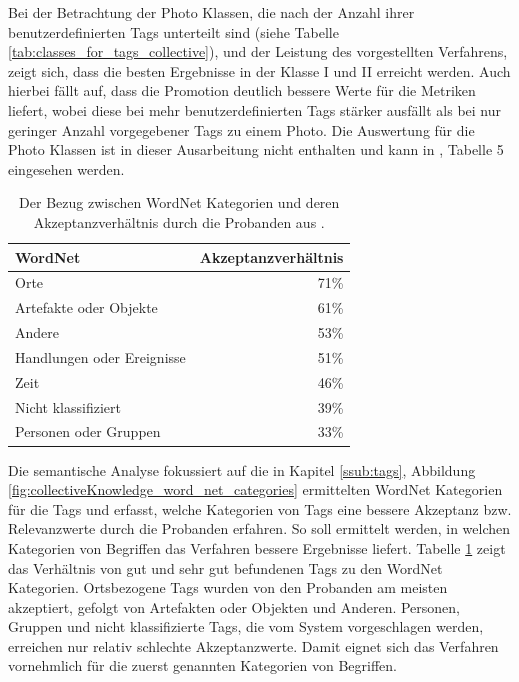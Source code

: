 Bei der Betrachtung der Photo Klassen, die nach der Anzahl ihrer benutzerdefinierten Tags unterteilt sind (siehe Tabelle \ref{tab:classes_for_tags_collective}), und der Leistung des vorgestellten Verfahrens, zeigt sich, dass die besten Ergebnisse in der Klasse I und II erreicht werden. Auch hierbei fällt auf, dass die Promotion deutlich bessere Werte für die Metriken liefert, wobei diese bei mehr benutzerdefinierten Tags stärker ausfällt als bei nur geringer Anzahl vorgegebener Tags zu einem Photo. Die Auswertung für die Photo Klassen ist in dieser Ausarbeitung nicht enthalten und kann in \cite{collectiveKnowledge}, Tabelle 5 eingesehen werden.

\begin{table}[htbp]
  \centering
  \begin{tabular}{lr}
  \hline
  \textbf{WordNet} & \textbf{Akzeptanzverhältnis}\\
  \hline
  Orte & 71\%\\
  \hline
  Artefakte oder Objekte & 61\%\\
  \hline
  Andere & 53\%\\
  \hline
  Handlungen oder Ereignisse & 51\%\\
  \hline
  Zeit & 46\%\\
  \hline
  Nicht klassifiziert & 39\%\\
  \hline
  Personen oder Gruppen & 33\%\\
  \hline
  \end{tabular}
  \caption{Der Bezug zwischen WordNet Kategorien und deren Akzeptanzverhältnis durch die Probanden aus \cite{collectiveKnowledge}.}
  \label{tab:wordNetResults}
\end{table}

Die semantische Analyse fokussiert auf die in Kapitel \ref{ssub:tags}, Abbildung \ref{fig:collectiveKnowledge_word_net_categories} ermittelten WordNet Kategorien für die Tags und erfasst, welche Kategorien von Tags eine bessere Akzeptanz bzw. Relevanzwerte durch die Probanden erfahren. So soll ermittelt werden, in welchen Kategorien von Begriffen das Verfahren bessere Ergebnisse liefert. Tabelle \ref{tab:wordNetResults} zeigt das Verhältnis von gut und sehr gut befundenen Tags zu den WordNet Kategorien. Ortsbezogene Tags wurden von den Probanden am meisten akzeptiert, gefolgt von Artefakten oder Objekten und Anderen. Personen, Gruppen und nicht klassifizierte Tags, die vom System vorgeschlagen werden, erreichen nur relativ schlechte Akzeptanzwerte. Damit eignet sich das Verfahren vornehmlich für die zuerst genannten Kategorien von Begriffen.

